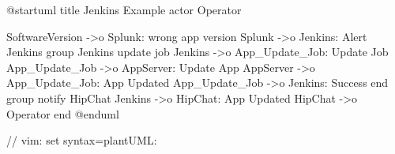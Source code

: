 @startuml
title Jenkins Example
actor Operator

SoftwareVersion ->o Splunk: wrong app version
Splunk ->o Jenkins: Alert Jenkins
group Jenkins update job
  Jenkins ->o App_Update_Job: Update Job
  App_Update_Job ->o AppServer: Update App
  AppServer ->o App_Update_Job: App Updated
  App_Update_Job ->o Jenkins: Success
end
group notify HipChat
  Jenkins ->o HipChat: App Updated
  HipChat ->o Operator
end
@enduml

// vim: set syntax=plantUML:
